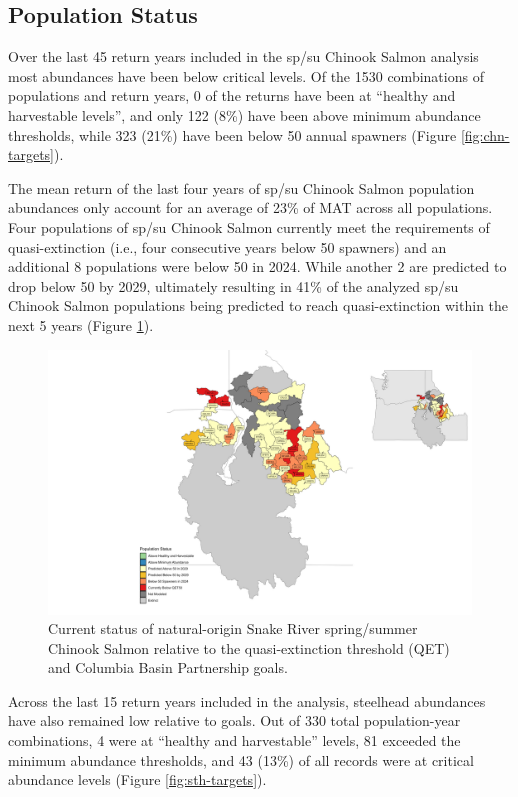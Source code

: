 \documentclass[12pt,a4paper]{article}
\begin{document}
\subsection{Population Status}\label{population-status-1}

Over the last 45 return years included in the sp/su Chinook Salmon analysis most abundances have been below critical levels. Of the 1530 combinations of populations and return years, 0 of the returns have been at ``healthy and harvestable levels'', and only 122 (8\%) have been above minimum abundance thresholds, while 323 (21\%) have been below 50 annual spawners (Figure \ref{fig:chn-targets}).

The mean return of the last four years of sp/su Chinook Salmon population abundances only account for an average of 23\% of MAT across all populations. Four populations of sp/su Chinook Salmon currently meet the requirements of quasi-extinction (i.e., four consecutive years below 50 spawners) and an additional 8 populations were below 50 in 2024. While another 2 are predicted to drop below 50 by 2029, ultimately resulting in 41\% of the analyzed sp/su Chinook Salmon populations being predicted to reach quasi-extinction within the next 5 years (Figure \ref{fig:chn-qet-map}).

\begin{figure}
\includegraphics[width=1\linewidth]{../figures/Chinook_salmon/Chinook_salmon_map_2024} \caption{Current status of natural-origin Snake River spring/summer Chinook Salmon relative to the quasi-extinction threshold (QET) and Columbia Basin Partnership goals.}\label{fig:chn-qet-map}
\end{figure}

Across the last 15 return years included in the analysis, steelhead abundances have also remained low relative to goals. Out of 330 total population-year combinations, 4 were at ``healthy and harvestable'' levels, 81 exceeded the minimum abundance thresholds, and 43 (13\%) of all records were at critical abundance levels (Figure \ref{fig:sth-targets}).
\end{document}
